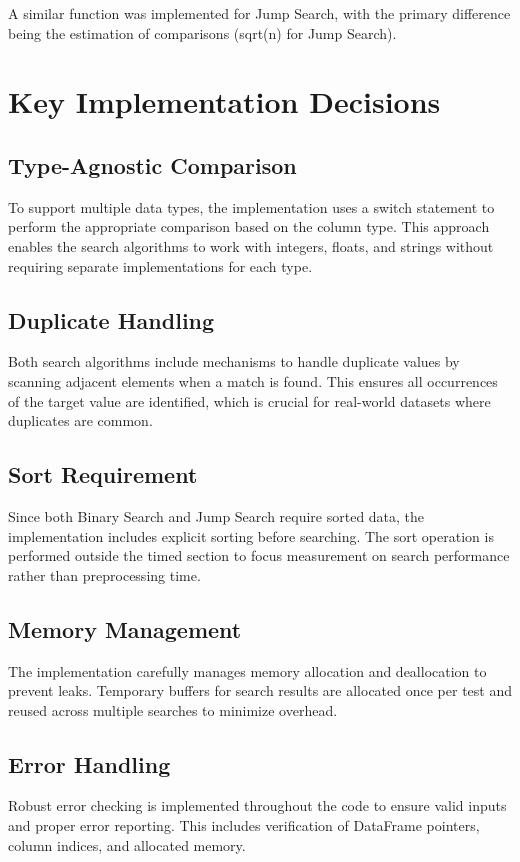 A similar function was implemented for Jump Search, with the primary difference being the estimation of comparisons (sqrt(n) for Jump Search).

\section{Key Implementation Decisions}

\subsection{Type-Agnostic Comparison}
To support multiple data types, the implementation uses a switch statement to perform the appropriate comparison based on the column type. This approach enables the search algorithms to work with integers, floats, and strings without requiring separate implementations for each type.

\subsection{Duplicate Handling}
Both search algorithms include mechanisms to handle duplicate values by scanning adjacent elements when a match is found. This ensures all occurrences of the target value are identified, which is crucial for real-world datasets where duplicates are common.

\subsection{Sort Requirement}
Since both Binary Search and Jump Search require sorted data, the implementation includes explicit sorting before searching. The sort operation is performed outside the timed section to focus measurement on search performance rather than preprocessing time.

\subsection{Memory Management}
The implementation carefully manages memory allocation and deallocation to prevent leaks. Temporary buffers for search results are allocated once per test and reused across multiple searches to minimize overhead.

\subsection{Error Handling}
Robust error checking is implemented throughout the code to ensure valid inputs and proper error reporting. This includes verification of DataFrame pointers, column indices, and allocated memory.

